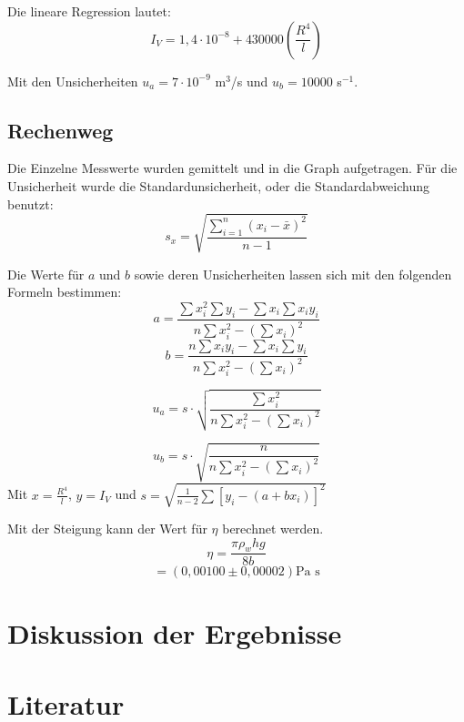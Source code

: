 \documentclass[11pt,a4paper]{article}
\begin{document}
Die lineare Regression lautet:
$$ I_V = 1,4\cdot 10^{-8} + 430000 (\frac{R^4}{l})$$

Mit den Unsicherheiten $u_a = 7\cdot 10^{-9}$ m$^3$/s und $u_b = 10000$ s$^{-1}$. 

\begin{tcolorbox}[colback=white]
	\subsection{Rechenweg}
	Die Einzelne Messwerte wurden gemittelt und in die Graph aufgetragen. Für die Unsicherheit wurde die Standardunsicherheit, oder die Standardabweichung benutzt:
	$$s_x = \sqrt{\frac{\sum_{i=1}^{n}(x_i-\bar{x})^2}{n-1}} $$
	
	Die Werte für $a$ und $b$ sowie deren Unsicherheiten lassen sich mit den folgenden Formeln bestimmen:
	$$a = \frac{
	\sum x_i^2 \sum y_i - \sum x_i \sum x_iy_i
}{
n \sum x_i^2 - (\sum x_i)^2
}$$
$$ b = \frac{
n\sum x_iy_i-\sum x_i \sum y_i
}{
n \sum x_i^2 - (\sum x_i)^2
}$$

$$u_a = s\cdot \sqrt{
\frac{
\sum x_i^2
}{
n\sum x_i^2 - (\sum x_i)^2
}}$$

$$u_b = s\cdot \sqrt{
\frac{
n
}{
n\sum x_i^2 - (\sum x_i)^2
}}$$
Mit $x = \frac{R^4}{l}$, $y = I_V$ und $s = \sqrt{
\frac{1}{n-2}\sum [y_i-(a+bx_i)]^2}$
\end{tcolorbox}

Mit der Steigung kann der Wert für $\eta$ berechnet werden. 
$$\eta = \frac{\pi \rho_w hg}{8b}$$
$$ = (0,00100 \pm 0,00002) \textrm{Pa s} $$


\section{Diskussion der Ergebnisse}

\section{Literatur}

	
	
	
	
	
	
	
	
	
	
	
	
\end{document}
